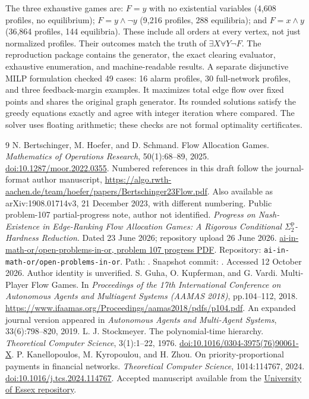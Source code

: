 \documentclass[11pt]{article}
\newcommand{\sig}{\Sigma^{\mathrm p}_2}
\begin{document}
The three exhaustive games are: $F=y$ with no existential variables (4,608 profiles, no equilibrium); $F=y\land\neg y$ (9,216 profiles, 288 equilibria); and $F=x\land y$ (36,864 profiles, 144 equilibria). These include all orders at every vertex, not just normalized profiles. Their outcomes match the truth of $\exists X\forall Y\neg F$. The reproduction package contains the generator, the exact clearing evaluator, exhaustive enumeration, and machine-readable results. A separate disjunctive MILP formulation checked 49 cases: 16 alarm profiles, 30 full-network profiles, and three feedback-margin examples. It maximizes total edge flow over fixed points and shares the original graph generator. Its rounded solutions satisfy the greedy equations exactly and agree with integer iteration where compared. The solver uses floating arithmetic; these checks are not formal optimality certificates.


\begingroup
\footnotesize
\begin{thebibliography}{9}
 N. Bertschinger, M. Hoefer, and D. Schmand. Flow Allocation Games. \emph{Mathematics of Operations Research}, 50(1):68--89, 2025. \href{https://doi.org/10.1287/moor.2022.0355}{doi:10.1287/moor.2022.0355}. Numbered references in this draft follow the journal-format author manuscript, \url{https://algo.rwth-aachen.de/team/hoefer/papers/Bertschinger23Flow.pdf}. Also available as arXiv:1908.01714v3, 21 December 2023, with different numbering.
 Public problem-107 partial-progress note, author not identified. \emph{Progress on Nash-Existence in Edge-Ranking Flow Allocation Games: A Rigorous Conditional $\sig$-Hardness Reduction}. Dated 23 June 2026; repository upload 26 June 2026. \href{https://github.com/ai-in-math-or/open-problems-in-or/blob/3b2de3237c29623f479c52c31db54fd60b97fd3c/data/llm_math_export/solution_progress/W4391111008_p0/partial_progress/107.pdf}{ai-in-math-or/open-problems-in-or, problem 107 progress PDF}. Repository: \texttt{ai-in-math-or/open-problems-in-or}. Path: . Snapshot commit: . Accessed 12 October 2026. Author identity is unverified.
 S. Guha, O. Kupferman, and G. Vardi. Multi-Player Flow Games. In \emph{Proceedings of the 17th International Conference on Autonomous Agents and Multiagent Systems (AAMAS 2018)}, pp.104--112, 2018. \url{https://www.ifaamas.org/Proceedings/aamas2018/pdfs/p104.pdf}. An expanded journal version appeared in \emph{Autonomous Agents and Multi-Agent Systems}, 33(6):798--820, 2019.
 L. J. Stockmeyer. The polynomial-time hierarchy. \emph{Theoretical Computer Science}, 3(1):1--22, 1976. \href{https://doi.org/10.1016/0304-3975(76)90061-X}{doi:10.1016/0304-3975(76)90061-X}.
 P. Kanellopoulos, M. Kyropoulou, and H. Zhou. On priority-proportional payments in financial networks. \emph{Theoretical Computer Science}, 1014:114767, 2024. \href{https://doi.org/10.1016/j.tcs.2024.114767}{doi:10.1016/j.tcs.2024.114767}. Accepted manuscript available from the \href{https://repository.essex.ac.uk/38989/}{University of Essex repository}.
\end{thebibliography}
\endgroup
\end{document}
